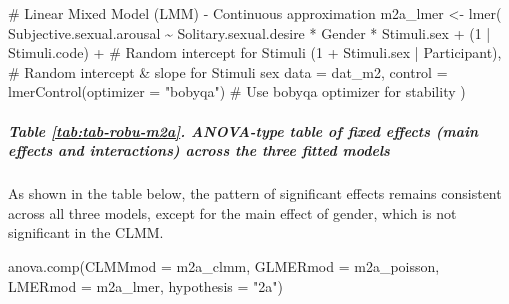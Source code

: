 \documentclass[
  bookmarksnumbered]{article}
\newenvironment{Shaded}{\begin{snugshade}}{\end{snugshade}}
\newcommand{\AttributeTok}[1]{\textcolor[rgb]{0.80,0.80,0.80}{#1}}
\newcommand{\CommentTok}[1]{\textcolor[rgb]{0.50,0.62,0.50}{#1}}
\newcommand{\DecValTok}[1]{\textcolor[rgb]{0.86,0.86,0.80}{#1}}
\newcommand{\FunctionTok}[1]{\textcolor[rgb]{0.94,0.94,0.56}{#1}}
\newcommand{\NormalTok}[1]{\textcolor[rgb]{0.80,0.80,0.80}{#1}}
\newcommand{\OtherTok}[1]{\textcolor[rgb]{0.94,0.94,0.56}{#1}}
\newcommand{\SpecialCharTok}[1]{\textcolor[rgb]{0.86,0.64,0.64}{#1}}
\newcommand{\StringTok}[1]{\textcolor[rgb]{0.80,0.58,0.58}{#1}}
\begin{document}
\begin{Shaded}
\begin{Highlighting}[]
\CommentTok{\# Linear Mixed Model (LMM) {-} Continuous approximation}
\NormalTok{m2a\_lmer }\OtherTok{\textless{}{-}} \FunctionTok{lmer}\NormalTok{(}
\NormalTok{  Subjective.sexual.arousal }\SpecialCharTok{\textasciitilde{}}\NormalTok{ Solitary.sexual.desire }\SpecialCharTok{*}\NormalTok{ Gender }\SpecialCharTok{*}\NormalTok{ Stimuli.sex }\SpecialCharTok{+}
\NormalTok{    (}\DecValTok{1} \SpecialCharTok{|}\NormalTok{ Stimuli.code) }\SpecialCharTok{+} \CommentTok{\# Random intercept for Stimuli}
\NormalTok{    (}\DecValTok{1} \SpecialCharTok{+}\NormalTok{ Stimuli.sex }\SpecialCharTok{|}\NormalTok{ Participant), }\CommentTok{\# Random intercept \& slope for Stimuli sex}
  \AttributeTok{data =}\NormalTok{ dat\_m2,}
  \AttributeTok{control =} \FunctionTok{lmerControl}\NormalTok{(}\AttributeTok{optimizer =} \StringTok{"bobyqa"}\NormalTok{) }\CommentTok{\# Use \textquotesingle{}bobyqa\textquotesingle{} optimizer for stability}
\NormalTok{)}
\end{Highlighting}
\end{Shaded}

\subparagraph{Table \ref{tab:tab-robu-m2a}. ANOVA-type table of fixed effects (main effects and interactions) across the three fitted models}\label{table-reftabtab-robu-m2a.-anova-type-table-of-fixed-effects-main-effects-and-interactions-across-the-three-fitted-models}

As shown in the table below, the pattern of significant effects remains consistent across all three models, except for the main effect of gender, which is not significant in the CLMM.

\begin{Shaded}
\begin{Highlighting}[]
\FunctionTok{anova.comp}\NormalTok{(}\AttributeTok{CLMMmod =}\NormalTok{ m2a\_clmm, }\AttributeTok{GLMERmod =}\NormalTok{ m2a\_poisson, }\AttributeTok{LMERmod =}\NormalTok{ m2a\_lmer, }\AttributeTok{hypothesis =} \StringTok{"2a"}\NormalTok{)}
\end{Highlighting}
\end{Shaded}
\end{document}
